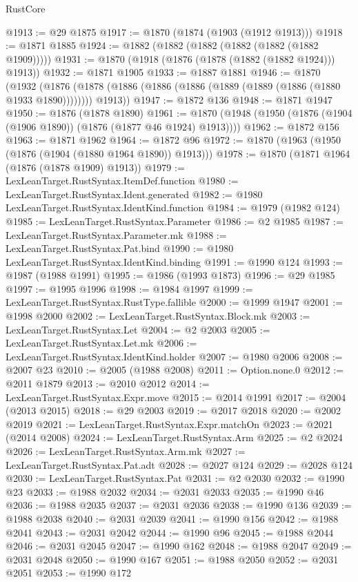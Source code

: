\begin{lexlean}{RustCore}
\begin{coremodule}
@1913 := @29 @1875
@1917 := @1870 (@1874 (@1903 (@1912 @1913)))
@1918 := @1871 @1885
@1924 := @1882 (@1882 (@1882 (@1882 (@1882 (@1882 @1909)))))
@1931 := @1870 (@1918 (@1876 (@1878 (@1882 (@1882 @1924))) @1913))
@1932 := @1871 @1905
@1933 := @1887 @1881
@1946 := @1870
    (@1932
      (@1876 (@1878 (@1886 (@1886 (@1886 (@1889 (@1889 (@1886 (@1880 @1933 @1890)))))))) @1913))
@1947 := @1872 @136
@1948 := @1871 @1947
@1950 := @1876 (@1878 @1890)
@1961 := @1870 (@1948 (@1950 (@1876 (@1904 (@1906 @1890)) (@1876 (@1877 @46 @1924) @1913))))
@1962 := @1872 @156
@1963 := @1871 @1962
@1964 := @1872 @96
@1972 := @1870 (@1963 (@1950 (@1876 (@1904 (@1880 @1964 @1890)) @1913)))
@1978 := @1870 (@1871 @1964 (@1876 (@1878 @1909) @1913))
@1979 := LexLeanTarget.RustSyntax.ItemDef.function
@1980 := LexLeanTarget.RustSyntax.Ident.generated
@1982 := @1980 LexLeanTarget.RustSyntax.IdentKind.function
@1984 := @1979 (@1982 @124)
@1985 := LexLeanTarget.RustSyntax.Parameter
@1986 := @2 @1985
@1987 := LexLeanTarget.RustSyntax.Parameter.mk
@1988 := LexLeanTarget.RustSyntax.Pat.bind
@1990 := @1980 LexLeanTarget.RustSyntax.IdentKind.binding
@1991 := @1990 @124
@1993 := @1987 (@1988 @1991)
@1995 := @1986 (@1993 @1873)
@1996 := @29 @1985
@1997 := @1995 @1996
@1998 := @1984 @1997
@1999 := LexLeanTarget.RustSyntax.RustType.fallible
@2000 := @1999 @1947
@2001 := @1998 @2000
@2002 := LexLeanTarget.RustSyntax.Block.mk
@2003 := LexLeanTarget.RustSyntax.Let
@2004 := @2 @2003
@2005 := LexLeanTarget.RustSyntax.Let.mk
@2006 := LexLeanTarget.RustSyntax.IdentKind.holder
@2007 := @1980 @2006
@2008 := @2007 @23
@2010 := @2005 (@1988 @2008)
@2011 := Option.none.{0}
@2012 := @2011 @1879
@2013 := @2010 @2012
@2014 := LexLeanTarget.RustSyntax.Expr.move
@2015 := @2014 @1991
@2017 := @2004 (@2013 @2015)
@2018 := @29 @2003
@2019 := @2017 @2018
@2020 := @2002 @2019
@2021 := LexLeanTarget.RustSyntax.Expr.matchOn
@2023 := @2021 (@2014 @2008)
@2024 := LexLeanTarget.RustSyntax.Arm
@2025 := @2 @2024
@2026 := LexLeanTarget.RustSyntax.Arm.mk
@2027 := LexLeanTarget.RustSyntax.Pat.adt
@2028 := @2027 @124
@2029 := @2028 @124
@2030 := LexLeanTarget.RustSyntax.Pat
@2031 := @2 @2030
@2032 := @1990 @23
@2033 := @1988 @2032
@2034 := @2031 @2033
@2035 := @1990 @46
@2036 := @1988 @2035
@2037 := @2031 @2036
@2038 := @1990 @136
@2039 := @1988 @2038
@2040 := @2031 @2039
@2041 := @1990 @156
@2042 := @1988 @2041
@2043 := @2031 @2042
@2044 := @1990 @96
@2045 := @1988 @2044
@2046 := @2031 @2045
@2047 := @1990 @162
@2048 := @1988 @2047
@2049 := @2031 @2048
@2050 := @1990 @167
@2051 := @1988 @2050
@2052 := @2031 @2051
@2053 := @1990 @172

\end{coremodule}
\end{lexlean}
